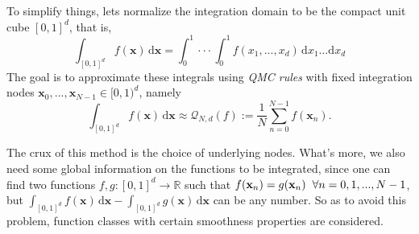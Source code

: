 To simplify things, lets normalize the integration domain to be the compact unit cube $[0,1]^d$, that is,
\begin{equation*}
    \int_{[0,1]^d} f(\textbf{x})\,\mathrm{d}\textbf{x} = \int_0^1 \cdot \cdot \cdot \int_0^1 f(x_1,...,x_d)\,\mathrm{d}x_1\ldots\mathrm{d}x_d
\end{equation*}
The goal is to approximate these integrals using \textit{QMC rules} with fixed integration nodes $\textbf{x}_0,...,\textbf{x}_{N-1} \in [0,1)^d$, namely
\begin{equation} \label{QMC}
    \int_{[0,1]^d} f(\textbf{x})\,\mathrm{d}\textbf{x} \approx \mathcal{Q}_{N,d}(f) := \frac{1}{N} \sum_{n=0}^{N-1} f(\textbf{x}_n).
\end{equation}
\vspace{2mm}

The crux of this method is the choice of underlying nodes. What's more, we also need some global information on the functions to be integrated, since one can find two functions $f,g : [0,1]^d \longrightarrow \mathbb{R}$ such that $f(\textbf{x}_n) = g(\textbf{x}_n) \hspace{2mm} \forall n=0,1,...,N-1$, but $\int_{[0,1]^d} f(\textbf{x})\,\mathrm{d}\textbf{x} - \int_{[0,1]^d} g(\textbf{x})\,\mathrm{d}\textbf{x}$ can be any number. So as to avoid this problem, function classes with certain smoothness properties are considered.\\

